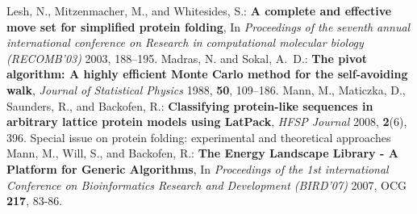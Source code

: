 \documentclass{article}
\begin{document}
\begin{thebibliography}{99}
 {
	Lesh, N., Mitzenmacher, M., and Whitesides, S.:
	{\bfseries A complete and effective move set for simplified protein folding},
	In \emph{Proceedings of the seventh annual international conference
	  on Research in computational molecular biology (RECOMB'03)} 2003,
	 188--195.
	}
 {
	Madras, N. and Sokal, A.~D.:
	{\bfseries The pivot algorithm: A highly efficient {Monte Carlo} method for the
	  self-avoiding walk},
	\emph{Journal of Statistical Physics} 1988,
	{\bfseries 50}, 109--186.
	}
 {
	Mann, M., Maticzka, D., Saunders, R., and Backofen, R.:
	{\bfseries Classifying protein-like sequences in arbitrary lattice protein models using {LatPack}},
	\emph{HFSP Journal} 2008,
	{\bfseries 2}(6), 396.
	Special issue on protein folding: experimental and theoretical approaches
	}
 {
	Mann, M., Will, S., and Backofen, R.:
	{\bfseries The Energy Landscape Library - A Platform for Generic Algorithms},
	In \emph{Proceedings of the 1st international Conference on Bioinformatics 
	Research and Development (BIRD'07)} 2007,
	OCG {\bfseries 217}, 83-86.
	}


\end{thebibliography}
 
\end{document}
